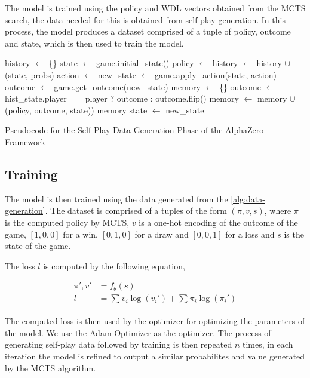 The model is trained using the policy and WDL vectors obtained from the MCTS search, the data needed for this is obtained from self-play generation. In this process, the model produces a dataset comprised of a tuple of policy, outcome and state, which is then used to train the model.

\begin{algorithm}[htb]
    \begin{algorithmic}[1]
            \State history $\gets$ \{\}
            \State state $\gets$ game.initial\_state()
            \Loop
                \State policy $\gets$ 
                \State history $\gets$ history $\cup$ (state, probs)
                \State action $\gets$ 
                \State new\_state $\gets$ game.apply\_action(state, action)
                \State outcome $\gets$ game.get\_outcome(new\_state)
                    \State memory $\gets$ \{\}
                        \State outcome $\gets$ hist\_state.player == player ? outcome : outcome.flip()
                        \State memory $\gets$ memory $\cup$ (policy, outcome, state))
                    \EndFor
                    \State \Return memory
                \EndIf
                \State state $\gets$ new\_state
            \EndLoop
        \EndFunction
    \end{algorithmic}
    \caption{Pseudocode for the Self-Play Data Generation Phase of the AlphaZero Framework}
    \label{alg:data-generation}
\end{algorithm}

\subsection{Training}

The model is then trained using the data generated from the \ref{alg:data-generation}. The dataset is comprised of a tuples of the form $(\pi, v, s)$, where $\pi$ is the computed policy by MCTS, $v$ is a one-hot encoding of the outcome of the game, $[1, 0, 0]$ for a win, $[0, 1, 0]$ for a draw and $[0, 0, 1]$ for a loss and $s$ is the state of the game.

The loss $l$ is computed by the following equation,

\begin{align}
  \pi', v' &= f_{\theta}(s) \\
  l &= \sum_{}^{} v_{i}\log(v_{i}') + \sum_{}^{}\pi_{i}\log(\pi_{i}')
  \label{eq:loss}
\end{align}

The computed loss is then used by the optimizer for optimizing the parameters of the model. We use the Adam Optimizer \cite{kingma2017adammethodstochasticoptimization} as the optimizer. The process of generating self-play data followed by training is then repeated $n$ times, in each iteration the model is refined to output a similar probabilites and value generated by the MCTS algorithm.
